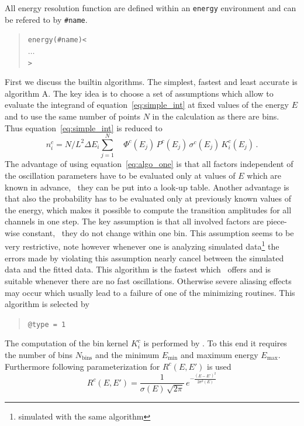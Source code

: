 All energy resolution function are defined within an {\tt energy} environment
and can be refered to by {\tt \#name}.
\begin{quote}
  {\tt energy(\#name)<\\
\tb $\ldots$\\
>}
\end{quote}



First we discuss the builtin algorithms. The simplest, fastest and
least accurate is algorithm A. The key idea is to choose a set of assumptions
which allow to evaluate the integrand of equation~\ref{eq:simple_int}
at fixed values of the energy $E$ and to use the same number of points $N$ in
the calculation as there are bins. Thus equation~\ref{eq:simple_int} is reduced
to
\begin{equation}
\label{eq:algo_one}
n_i^c=N/L^2 \Delta E_i \sum_{j=1}^N \quad  \Phi^c(E_j)\,
P^c(E_j)\,
\sigma^c(E_j)\,
K_i^c(E_j)\,.
\end{equation}
The advantage of using equation~\ref{eq:algo_one} is that all factors
independent of the oscillation parameters have to be evaluated only at 
values of $E$ which are known in advance, \ie\ they can be put 
into a look-up table. Another advantage is that also the probability
has to be evaluated only at previously known values of the energy, which
makes it possible to compute the transition amplitudes for all channels
in one step. The key assumption is that all involved factors are piece-wise
constant, \ie\ they do not change within one bin. This assumption seems to be
very restrictive, note however whenever one is analyzing simulated 
data\footnote{simulated with the same algorithm} the errors
made by violating this assumption nearly cancel between the simulated 
data and the fitted data. This algorithm is the fastest which \GLOBES\ offers
and is suitable whenever there are no fast oscillations. Otherwise severe
aliasing effects may occur which usually lead to a failure of one of the 
minimizing routines. This algorithm is selected by
\begin{quote}
{\tt \tb @type = 1}
\end{quote}
The computation of the bin kernel $K_i^c$ is performed
by \GLOBES. To this end it requires  the number of bins
 $N_\mathrm{bins}$
and the minimum $E_\mathrm{min}$ and maximum energy $E_\mathrm{max}$. 
Furthermore following parameterization
for $R^c(E,E')$ is used
\begin{equation}
R^c(E,E')=\frac{1}{\sigma(E)\,\sqrt{2\pi}}\,e^{-\frac{(E-E')^2}{2\sigma^2(E)}}
\end{equation} 
